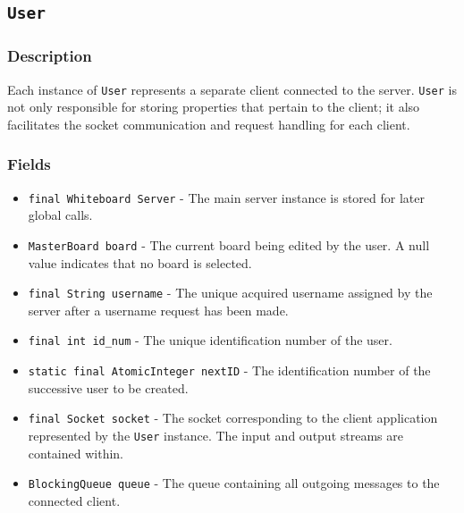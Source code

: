\subsection{\texttt{User}}

\subsubsection{Description}
Each instance of \texttt{User} represents a separate client connected to the server. \texttt{User} is not only responsible for storing properties that pertain to the client; it also facilitates the socket communication and request handling for each client.

\subsubsection{Fields}
\begin{itemize}
\item \texttt{final Whiteboard Server} - The main server instance is stored for later global calls.
\item \texttt{MasterBoard board} - The current board being edited by the user. A null value indicates that no board is selected.
\item \texttt{final String username} - The unique acquired username assigned by the server after a username request has been made.
\item \texttt{final int id\_num} - The unique identification number of the user.
\item \texttt{static final AtomicInteger nextID} - The identification number of the successive user to be created.
\item \texttt{final Socket socket} - The socket corresponding to the client application represented by the \texttt{User} instance. The input and output streams are contained within.
\item \texttt{BlockingQueue queue} - The queue containing all outgoing messages to the connected client.
\end{itemize}

